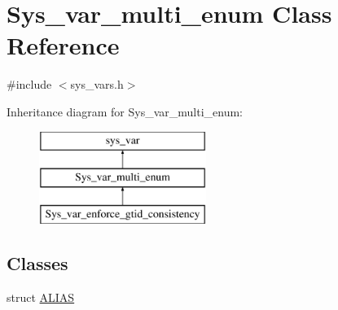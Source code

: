 \hypertarget{classSys__var__multi__enum}{}\section{Sys\+\_\+var\+\_\+multi\+\_\+enum Class Reference}
\label{classSys__var__multi__enum}


{\ttfamily \#include $<$sys\+\_\+vars.\+h$>$}

Inheritance diagram for Sys\+\_\+var\+\_\+multi\+\_\+enum\+:\begin{figure}[H]
\begin{center}
\leavevmode
\includegraphics[height=3.000000cm]{classSys__var__multi__enum}
\end{center}
\end{figure}
\subsection*{Classes}
\begin{DoxyCompactItemize}
\item 
struct \mbox{\hyperlink{structSys__var__multi__enum_1_1ALIAS}{A\+L\+I\+AS}}
\end{DoxyCompactItemize}

